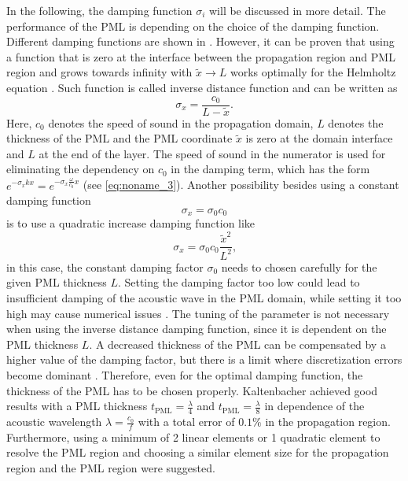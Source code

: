 In the following, the damping function $\sigma_i$ will be discussed in more detail. The performance of the PML is depending on the choice of the damping function. Different damping functions are shown in \cite{kaltenbacher_numerical_2007}. However, it can be proven that using a function that is zero at the interface between the propagation region and PML region and grows towards infinity with $\tilde{x}\rightarrow L$ works optimally for the Helmholtz equation \cite{kaltenbacher_numerical_2007,KALTENBACHER_PML_2013}. Such function is called inverse distance function and can be written as
\begin{equation}
	\sigma_x = \frac{c_0}{L - \tilde{x}}\text{.}
\end{equation}
Here, $c_0$ denotes the speed of sound in the propagation domain, $L$ denotes the thickness of the PML and the PML coordinate $\tilde{x}$ is zero at the domain interface and $L$ at the end of the layer. The speed of sound in the numerator is used for eliminating the dependency on $c_0$ in the damping term, which has the form $e^{-\sigma_x kx} = e^{-\sigma_x \frac{\omega}{c_0} x}$ (see \cref{eq:noname_3}). Another possibility besides using a constant damping function
\begin{equation}
	\sigma_x = \sigma_0c_0
\end{equation}
is to use a quadratic increase damping function like
\begin{equation}
	\sigma_x = \sigma_0c_0\frac{\tilde{x}^2}{L^2}\text{,}
\end{equation}
in this case, the constant damping factor $\sigma_0$ needs to chosen carefully for the given PML thickness $L$. Setting the damping factor too low could lead to insufficient damping of the acoustic wave in the PML domain, while setting it too high may cause numerical issues \cite{KALTENBACHER_PML_2013}. The tuning of the parameter is not necessary when using the inverse distance damping function, since it is dependent on the PML thickness $L$. A decreased thickness of the PML can be compensated by a higher value of the damping factor, but there is a limit where discretization errors become dominant \cite{KALTENBACHER_PML_2013}. Therefore, even for the optimal damping function, the thickness of the PML has to be chosen properly. Kaltenbacher \cite{KALTENBACHER_PML_2013} achieved good results with a PML thickness $t_\text{PML} = \frac{\lambda}{4}$ and $t_\text{PML} = \frac{\lambda}{8}$ in dependence of the acoustic wavelength $\lambda = \frac{c_0}{f}$ with a total error of $0.1\%$ in the propagation region. Furthermore, using a minimum of 2 linear elements or 1 quadratic element to resolve the PML region and choosing a similar element size for the propagation region and the PML region were suggested.

